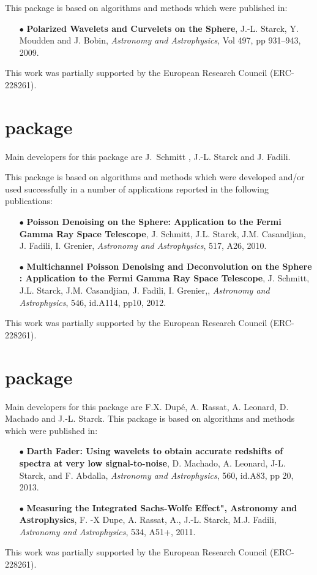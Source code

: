 This package is based on algorithms and methods which were published in:
\begin{itemize}
\item[$\bullet$] {\textbf{Polarized Wavelets and Curvelets on the Sphere}, J.-L. Starck, Y. Moudden and J. Bobin, \textit{Astronomy and Astrophysics}, Vol 497, pp 931--943, 2009.}
\end{itemize}

This work was partially supported by the European Research Council  (ERC-228261).

\section*{\projmsvsts package}

Main developers for this package are  J.~Schmitt , J.-L. Starck and J. Fadili.
 
This package is based on algorithms and methods which were 
developed and/or used successfully in a number of applications 
reported in the following publications: \\
\begin{itemize}
\item[$\bullet$] {\textbf{Poisson Denoising on the Sphere: Application to the Fermi Gamma Ray Space Telescope},   J. Schmitt, J.L. Starck, J.M. Casandjian, J. Fadili, I. Grenier, \textit{Astronomy and Astrophysics},  517, A26, 2010.}
\item[$\bullet$] {\textbf{Multichannel Poisson Denoising and Deconvolution on the Sphere : Application to the Fermi Gamma Ray Space Telescope}, J. Schmitt, J.L. Starck, J.M. Casandjian, J. Fadili, I. Grenier,, \textit{Astronomy and Astrophysics}, 546, id.A114, pp10, 2012.}
\end{itemize}

This work was partially supported by the European Research Council  (ERC-228261).

\section*{\projsgal package}
Main developers for this package are  F.X.  Dup\'e, A. Rassat, A. Leonard, D. Machado and  J.-L. Starck.
This package is based on algorithms and methods which were published in: \\
\begin{itemize}
\item[$\bullet$] { \textbf{Darth Fader: Using wavelets to obtain accurate redshifts of spectra at very low signal-to-noise}, 
D. Machado, A. Leonard, J-L. Starck, and F. Abdalla,  \textit{Astronomy and Astrophysics}, 560, id.A83, pp 20, 2013.}
\item[$\bullet$] {\textbf{Measuring the Integrated Sachs-Wolfe Effect", Astronomy and Astrophysics}, F. -X Dupe, A. Rassat, A., J.-L. Starck, M.J. Fadili, \textit{Astronomy and Astrophysics}, 534, A51+, 2011.}
\end{itemize}
This work was partially supported by the European Research Council  (ERC-228261).

